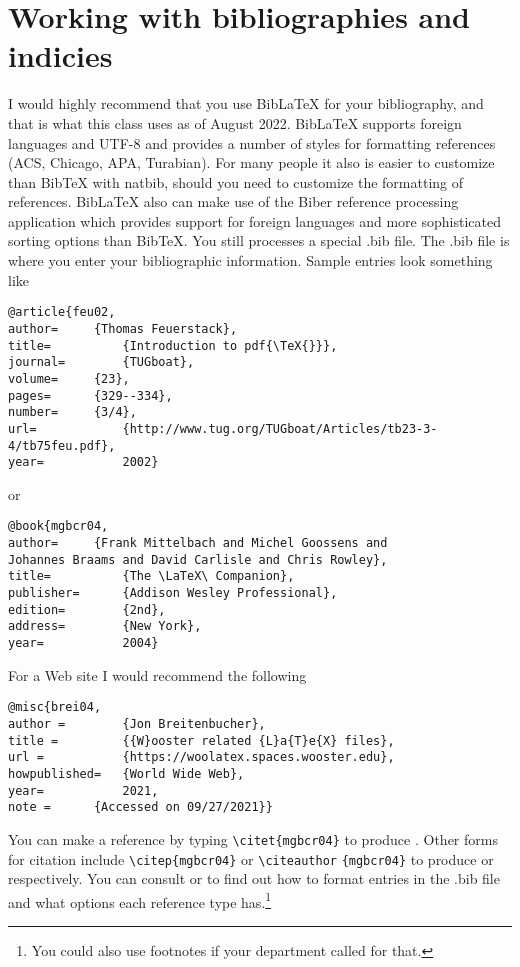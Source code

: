 \chapter{Working with bibliographies and indicies}\label{bibind}
I would highly recommend that you use Bib\LaTeX{} for your bibliography, and that is what this class uses as of August 2022. Bib\LaTeX{} supports foreign languages and UTF-8 and provides a number of styles for formatting references (ACS, Chicago, APA, Turabian). For many people it also is easier to customize than Bib\TeX{} with natbib, should you need to customize the formatting of references. Bib\LaTeX{} also can make use of the Biber reference processing application which provides support for foreign languages and more sophisticated sorting options than Bib\TeX{}. You still processes a special .bib file. The .bib file is where you enter your bibliographic information. Sample entries look something like
\begin{singlespace}\small
\begin{verbatim}
@article{feu02,
author=		{Thomas Feuerstack},
title=			{Introduction to pdf{\TeX{}}}, 
journal=		{TUGboat}, 
volume=		{23},
pages=		{329--334},
number=		{3/4},
url=			{http://www.tug.org/TUGboat/Articles/tb23-3-4/tb75feu.pdf},
year=			2002}
\end{verbatim}
\end{singlespace}
or
\begin{singlespace}\small
\begin{verbatim}
@book{mgbcr04,
author=		{Frank Mittelbach and Michel Goossens and
Johannes Braams and David Carlisle and Chris Rowley},
title=			{The \LaTeX\ Companion},
publisher=		{Addison Wesley Professional},
edition=		{2nd},
address=		{New York},
year=			2004}
\end{verbatim}
\end{singlespace}

For a Web site I would recommend the following
\begin{singlespace}\small
\begin{verbatim}
@misc{brei04,
author = 		{Jon Breitenbucher},
title = 		{{W}ooster related {L}a{T}e{X} files},
url = 			{https://woolatex.spaces.wooster.edu},
howpublished=	{World Wide Web},
year=			2021,
note = 		{Accessed on 09/27/2021}}
\end{verbatim}
\end{singlespace}

You can make a reference by typing \verb|\citet{mgbcr04}| to produce \citet{mgbcr04}. Other forms for citation include \verb|\citep{mgbcr04}| or  \verb|\citeauthor| \verb|{mgbcr04}| to produce \citep{mgbcr04} or \citeauthor{mgbcr04} respectively. You can consult \citet{kd03} or \citet{mgbcr04} to find out how to format entries in the .bib file and what options each reference type has.\footnote{You could also use footnotes if your department called for that.}


